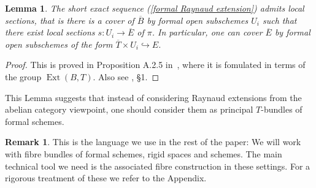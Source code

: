 \documentclass[10pt,oneside]{amsart}
\newtheorem{lemma}[theorem]{Lemma}
\theoremstyle{definition}
\newtheorem{remark}[theorem]{Remark}
\begin{document}
	\begin{lemma}\label{formal Raynaud sequence is locally split}
		The short exact sequence (\ref{formal Raynaud extension}) admits local sections, that is there is a cover of $\overline{B}$ by formal open subschemes $U_i$ such that there exist local sections $s:U_i\rightarrow \overline{E}$ of $\pi$. In particular, one can cover $\overline{E}$ by formal open subschemes of the form $\overline{T}\times U_i\hookrightarrow E$.
	\end{lemma}
	\begin{proof}
		This is proved in Proposition A.2.5 in~\cite{rigid geometry of curves}, where it is fomulated in terms of the group $\operatorname{Ext}(B,T)$. Also see \cite{BL}, \S 1.
	\end{proof}
	
	This Lemma suggests that instead of considering Raynaud extensions from the abelian category viewpoint, one should consider them as principal $T$-bundles of formal schemes.
	
	\begin{remark}
	This is the language we use in the rest of the paper: We will work with fibre bundles of formal schemes, rigid spaces and schemes. The main technical tool we need is the associated fibre construction in these settings. For a rigorous  treatment of these we refer to the Appendix.
	\end{remark}
	
\end{document}
